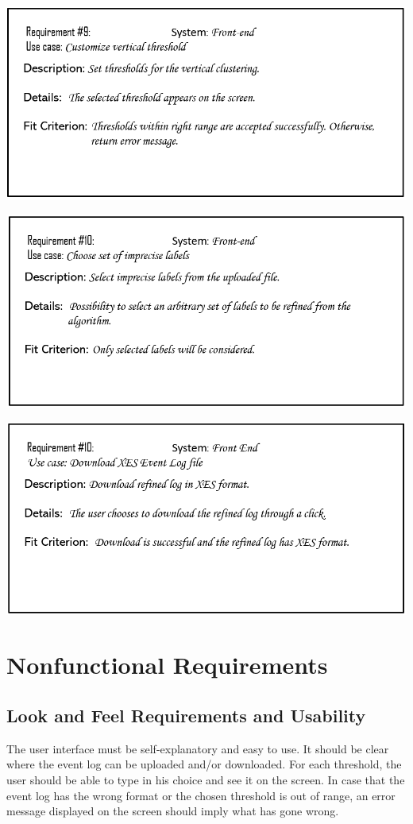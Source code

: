 \documentclass[notitlepage]{article}
\begin{document}
\begin{flushleft}
\includegraphics[scale=0.6]{reqq9.png}

\includegraphics[scale=0.6]{reqq10.png}

\includegraphics[scale=0.6]{reqq11.png}




\section{Nonfunctional Requirements}

\subsection{Look and Feel Requirements and Usability}
The user interface must be self-explanatory and easy to use.
It should be clear where the event log can be uploaded and/or downloaded.
For each threshold, the user should be able to type in his choice and see it on the screen.
In case that the event log has the wrong format or the chosen threshold is out of range, an error message displayed on the screen should imply what has gone wrong.


\end{flushleft}
\end{document}
